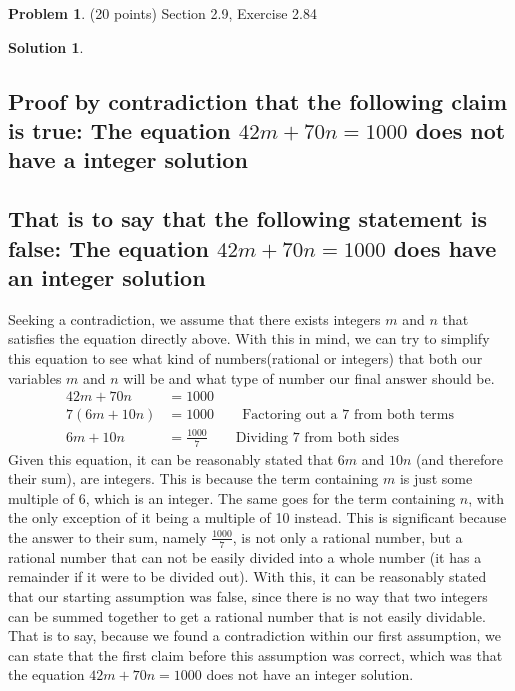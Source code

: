 \documentclass{article}
\theoremstyle{definition}
\newtheorem{problem}{Problem}
\newtheorem*{solution}{Solution}
\begin{document}
\newpage
\begin{problem} (20 points) Section 2.9, Exercise 2.84 
\end{problem}
\begin{solution} 
\hspace{1cm}
\subsection*{Proof by contradiction that the following claim is true: The equation $42m + 70n = 1000$ does not have a integer solution\\\\
That is to say that the following statement is false: The equation $42m + 70n = 1000$ does have an integer solution}
Seeking a contradiction, we assume that there exists integers $m$ and $n$ that satisfies the equation directly above. With this in mind, we can try to simplify this equation to see what kind of numbers(rational or integers) that both our variables $m$ and $n$ will be and what type of number our final answer should be.
\begin{align}
42m + 70n &= 1000\\
7(6m+10n) &= 1000 \quad \quad \mbox{Factoring out a 7 from both terms}\\
6m + 10n &= \frac{1000}{7} \quad \quad \mbox{Dividing 7 from both sides}
\end{align}
Given this equation, it can be reasonably stated that $6m$ and $10n$ (and therefore their sum), are integers. This is because the term containing $m$ is just some multiple of $6$, which is an integer. The same goes for the term containing $n$, with the only exception of it being a multiple of 10 instead. This is significant because the answer to their sum, namely $\frac{1000}{7}$, is not only a rational number, but a rational number that can not be easily divided into a whole number (it has a remainder if it were to be divided out). With this, it can be reasonably stated that our starting assumption was false, since there is no way that two integers can be summed together to get a rational number that is not easily dividable. That is to say, because we found a contradiction within our first assumption, we can state that the first claim before this assumption was correct, which was that the equation $42m + 70n = 1000$ does not have an integer solution.
\end{solution}
\end{document}
